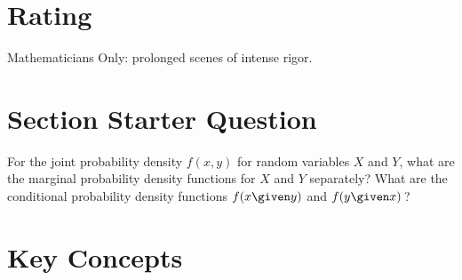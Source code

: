 \documentclass[12pt]{article}
\begin{document}
\myheader \mytitle

\hr


\hr

\usefirefox

\hr



\section*{Rating} %
Mathematicians Only:  prolonged scenes of intense rigor.

\hr

\section*{Section Starter Question} For the joint probability density \(
f(x,y) \) for random variables \( X \) and \( Y \), what are the
marginal probability density functions for \( X \) and \( Y \)
separately?  What are the conditional probability density functions \( f
(x \given y) \) and \( f(y \given x) \)\,?

\hr

\section*{Key Concepts}
\end{document}
